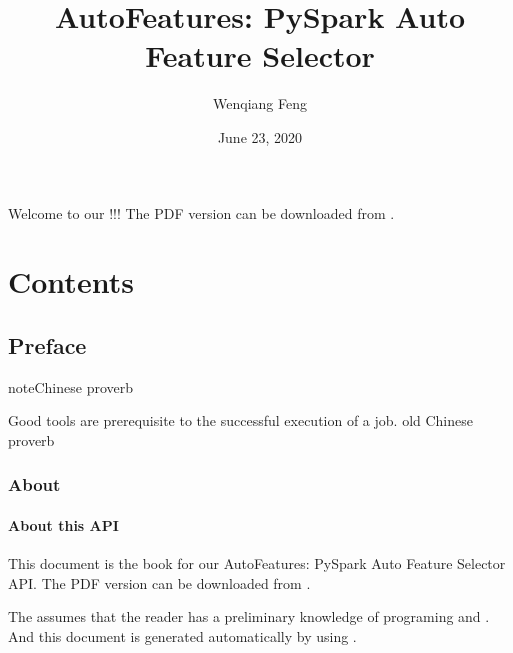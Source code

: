 \documentclass[letterpaper,11pt,english]{sphinxmanual}
\title{AutoFeatures: PySpark Auto Feature Selector}
\date{June 23, 2020}
\author{Wenqiang Feng}
\begin{document}
\pagestyle{empty}
\sphinxmaketitle
\pagestyle{plain}
\sphinxtableofcontents
\pagestyle{normal}
\label{\detokenize{index::doc}}

\begin{quote}

\begin{figure}[htbp]
\centering

\noindent{}
\end{figure}
\end{quote}

Welcome to our !!! The PDF version
can be downloaded from .


\chapter{Contents}
\label{\detokenize{index:contents}}

\section{Preface}
\label{\detokenize{preface:preface}}\label{\detokenize{preface:id1}}\label{\detokenize{preface::doc}}
\begin{sphinxadmonition}{note}{Chinese proverb}

Good tools are prerequisite to the successful execution of a job. \textendash{} old Chinese proverb
\end{sphinxadmonition}


\subsection{About}
\label{\detokenize{preface:about}}

\subsubsection{About this API}
\label{\detokenize{preface:about-this-api}}
This document is the  book for our AutoFeatures: PySpark Auto Feature Selector  API.
The PDF version can be downloaded from . 

The  assumes that the reader has a preliminary knowledge of  programing and . And this
document is generated automatically by using .
\end{document}
